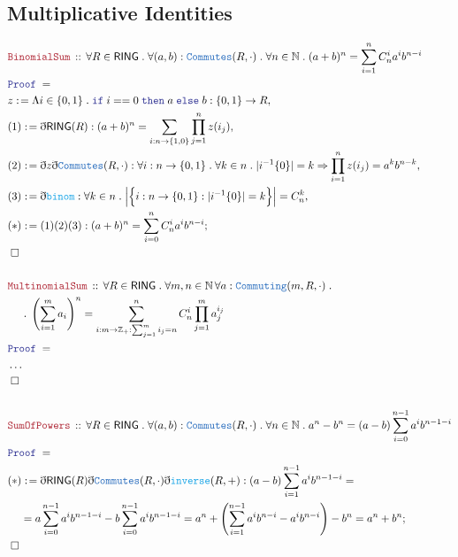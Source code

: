 \documentclass[12pt]{scrartcl}
\newcommand{\TYPE}[1]{\textcolor{NavyBlue}{\mathtt{#1}}}
\newcommand{\FUNC}[1]{\textcolor{Cerulean}{\mathtt{#1}}}
\newcommand{\LOGIC}[1]{\textcolor{Blue}{\mathtt{#1}}}
\newcommand{\THM}[1]{\textcolor{Maroon}{\mathtt{#1}}}
\renewcommand{\.}{\; . \;}
\newcommand{\de}{: \kern 0.1pc =}
\newcommand{\If}{\LOGIC{if} \;}
\newcommand{\Then}{ \; \LOGIC{then} \;}
\newcommand{\Else}{\; \LOGIC{else} \;}
\newcommand{\Theorem}[2]{& \THM{#1} \, :: \, #2 \\ & \Proof = \\ }
\newcommand{\NewLine}{\\ & \kern 1pc}
\newcommand{\Page}[1]{ \begin{align*} #1 \end{align*}   }
\newcommand{ \bd }{ \ByDef }
\newcommand{\NoProof}{ & \ldots \\ \EndProof}
\newcommand{\Int}{\mathbb{Z} }
\newcommand{\Nat}{\mathbb{N} }
\newcommand{\Say}[3]{& #1 \de #2 : #3, \\}
\newcommand{\Conclude}[3]{& #1 \de #2 : #3; \\}
\newcommand{\QED}{\; \square}
\newcommand{\EndProof}{& \QED \\}
\newcommand{\ByDef}{\eth}
\newcommand{\Proof}{\LOGIC{Proof} \; }
\newcommand{\RING}{\mathsf{RING}}
\begin{document}
\subsection{Multiplicative Identities}
\Page{
	\Theorem{BinomialSum}{ \forall R \in \RING \. \forall (a,b) : \TYPE{Commutes}(R,\cdot) \. \forall n \in \Nat \. (a + b)^n = \sum^n_{i=1} C^i_n a^i b^{n - i}}
	\Say{z}{\Lambda i \in \{0,1\} \. \If i == 0 \Then a \Else b}{ \{ 0,1 \} \to R   }
	\Say{(1)}{\bd \RING(R)}{  (a + b)^n = \sum_{i : n \to \{1,0\}} \prod^n_{j=1} z(i_j)   }
	\Say{(2)}{\bd z \bd \TYPE{Commutes}(R,\cdot)}{\forall i : n \to \{0,1\} \. \forall k \in n \. |i^{-1}\{0\}| = k \Rightarrow \prod^n_{i=1} z(i_j) = a^k b^{n-k}  }
	\Say{(3)}{ \bd \FUNC{binom}  }{ \forall k \in n \.  \Big|\Big\{ i : n \to \{0,1\} : |i^{-1}\{0\}| = k  \Big\}\Big|  = C^k_n}
	\Conclude{(*)}{(1)(2)(3)}{ (a + b)^n = \sum^n_{i=0} C^i_n a^i b^{n-i} }
	\EndProof
	\\
	\Theorem{MultinomialSum}{\forall R \in \RING \. \forall m,n \in \Nat \, \forall a : \TYPE{Commuting}(m,R,\cdot) \. 
		\NewLine \. \left( \sum^m_{i=1} a_i \right)^n = \sum^n_{i:m \to \Int_+ :\sum^m_{j=1}i_j =n}  C^i_n \prod^m_{j=1} a_j^{i_j}}
	\NoProof
	\\
	\Theorem{SumOfPowers}{\forall R \in \RING \. \forall (a,b) : \TYPE{Commutes}(R,\cdot) \. \forall n \in \Nat \.  a^n - b^n = (a - b) \sum^{n-1}_{i=0} a^i b^{n - 1 - i}   }
	\Conclude{(*)}{ \bd \RING(R) \bd \TYPE{Commutes}(R,\cdot) \bd \FUNC{inverse}(R,+) }{  
				(a - b) \sum^{n-1}_{i=1} a^i b^{n-1-i} =  \NewLine
				= a \sum^{n-1}_{i=0} a^i b^{n-1 -i}  - b \sum^{n-1}_{i=0} a^i b^{n-1-i}  =  
				 a^n  + \left(\sum^{n- 1}_{i=1}  a^i b^{n - i} - a^i b^{n-i} \right) - b^n = 
		  		a^n + b^n }
	\EndProof
}
\end{document}
